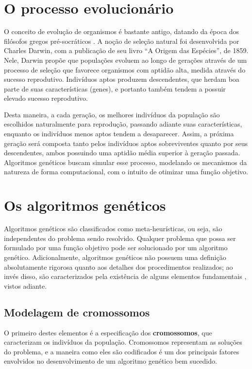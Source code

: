 \documentclass[12pt]{article}
\begin{document}
\section{O processo evolucionário} \label{sec:introevolution}

O conceito de evolução de organismos é bastante antigo, datando da época dos filósofos gregos pré-socráticos \cite{Hull1967}. A noção de seleção natural  foi desenvolvida por Charles Darwin, com a publicação de seu livro ``A Origem das Espécies'', de 1859. Nele, Darwin propõe que populações evoluem ao longo de gerações através de um processo de seleção que favorece organismos com aptidão alta, medida através do sucesso reprodutivo. Indivíduos aptos produzem descendentes, que herdam boa parte de suas características (genes), e portanto também tendem a possuir elevado sucesso reprodutivo.

Desta maneira, a cada geração, os melhores indivíduos da população são escolhidos naturalmente para reprodução, passando adiante suas características, enquanto os indivíduos menos aptos tendem a desaparecer. Assim, a próxima geração será composta tanto pelos indivíduos aptos sobreviventes quanto por seus descendentes, ambos possuindo uma aptidão média superior à geração passada. Algoritmos genéticos buscam simular esse processo, modelando os mecanismos da natureza de forma computacional, com o intuito de otimizar uma função objetivo.

\section{Os algoritmos genéticos} \label{sec:algorithm}

Algoritmos genéticos são classificados como meta-heurísticas, ou seja, são independentes do problema sendo resolvido. Qualquer problema que possa ser formulado por uma função objetivo pode ser solucionado por um algoritmo genético. Adicionalmente, algoritmos genéticos não possuem uma definição absolutamente rigorosa quanto aos detalhes dos procedimentos realizados; ao invés disso, são caracterizados pela existência de alguns elementos fundamentais \cite{Mitchell1998}, vistos adiante.

\subsection{Modelagem de cromossomos} \label{sec:chromosomes}

O primeiro destes elementos é a especificação dos \textbf{cromossomos}, que caracterizam os indivíduos da população. Cromossomos representam as soluções do problema, e a maneira como eles são codificados é um dos principais fatores envolvidos no desenvolvimento de um algoritmo genético bem sucedido.
\end{document}
